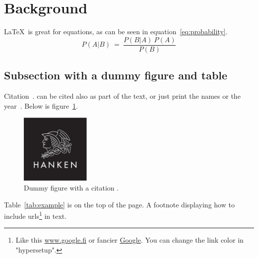 \documentclass[12pt, a4paper, oneside]{article}
\begin{document}
\clearpage


\section{Background} \label{sec:background}

\blindtext

\LaTeX~is great for equations, as can be seen in equation~\ref{eq:probability}.
\begin{equation} \label{eq:probability}
    P(A | B) \ = \ \frac{P(B | A) \ P(A)}{P(B)}
\end{equation}

\subsection{Subsection with a dummy figure and table} \label{subsec:subsection-with-a-dummy-figure-and-table}

Citation~\citep{hermanson2020anatomy, petersen2005advances}.
\citet{petersen2005advances} can be cited also as part of the text,
or just print the names \citeauthor{petersen2005advances} or the year~\citeyear{petersen2005advances}.
Below is figure~\ref{fig:figure}.

\begin{figure}[h]
    \centering
    \includegraphics[width=0.3\textwidth]{hanken_logo_platta}
    \caption[Dummy figure]{Dummy figure with a citation \citep{mellersh2014genetics}.}
    \label{fig:figure}
\end{figure}

\blindtext[2]

Table~\ref{tab:example} is on the top of the page.
A footnote displaying how to include urls\footnote{Like this \url{www.google.fi} or fancier \href{www.google.fi}{Google}.
    You can change the link color in "hypersetup".} in text.
\end{document}
